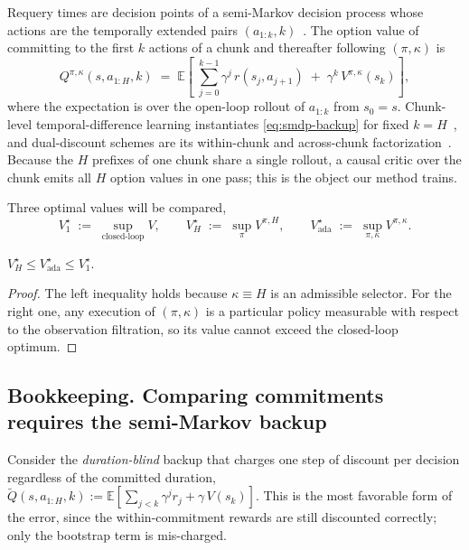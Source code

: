 Requery times are decision points of a semi-Markov decision process whose actions are the
temporally extended pairs $(a_{1:k},k)$~\citep{sutton1999options, bradtke1994smdp}. The option
value of committing to the first $k$ actions of a chunk and thereafter following $(\pi,\kappa)$ is
\begin{equation}
\label{eq:smdp-backup}
Q^{\pi,\kappa}(s, a_{1:H}, k)
  \;=\;
  \mathbb E\!\left[\;\sum_{j=0}^{k-1}\gamma^{j}\, r(s_j,a_{j+1})
  \;+\;\gamma^{k}\, V^{\pi,\kappa}(s_k)\right],
\end{equation}
where the expectation is over the open-loop rollout of $a_{1:k}$ from $s_0=s$. Chunk-level
temporal-difference learning instantiates \eqref{eq:smdp-backup} for fixed $k=H$~\citep{qc}, and
dual-discount schemes are its within-chunk and across-chunk factorization~\citep{deas}. Because the
$H$ prefixes of one chunk share a single rollout, a causal critic over the chunk emits all $H$
option values in one pass; this is the object our method trains.

Three optimal values will be compared,
\[
V^{\star}_{1}\;:=\;\sup_{\text{closed-loop}}V,
\qquad
V^{\star}_{H}\;:=\;\sup_{\pi}V^{\pi,H},
\qquad
V^{\star}_{\mathrm{ada}}\;:=\;\sup_{\pi,\kappa}V^{\pi,\kappa}.
\]

\begin{lemma}[Sandwich]
\label{lem:sandwich}
$V^{\star}_{H}\le V^{\star}_{\mathrm{ada}}\le V^{\star}_{1}$.
\end{lemma}
\begin{proof}
The left inequality holds because $\kappa\equiv H$ is an admissible selector. For the right one,
any execution of $(\pi,\kappa)$ is a particular policy measurable with respect to the observation
filtration, so its value cannot exceed the closed-loop optimum.
\end{proof}

\subsection{Bookkeeping. Comparing commitments requires the semi-Markov backup}
\label{app:bookkeeping}

Consider the \emph{duration-blind} backup that charges one step of discount per decision
regardless of the committed duration,
$\widetilde Q(s,a_{1:H},k):=\mathbb E[\sum_{j<k}\gamma^{j}r_j+\gamma\,V(s_k)]$. This is the most
favorable form of the error, since the within-commitment rewards are still discounted correctly;
only the bootstrap term is mis-charged.

